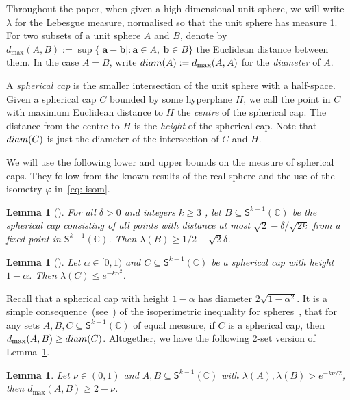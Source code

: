 \documentclass[11pt, a4paper]{article}
\newcommand{\V}[1]{\mathbold{#1}}
\newtheorem{lemma}[theorem]{Lemma}
\theoremstyle{definition}
\newcommand{\diam}[1]{{\rm{diam}}(#1)}
\newcommand{\sS}{\mathsf{S}}
\newcommand{\sC}{\mathbb{C}}
\begin{document}
Throughout the paper, when given a high dimensional unit sphere, we will write $\lambda$ for the Lebesgue measure, normalised so that the unit sphere has measure 1. For two subsets of a unit sphere $A$ and $B$, denote by $d_{\max}(A,B):=\sup\{|\V{a}-\V{b}|: \V{a}\in A,~\V{b}\in B \}$ the Euclidean distance between them. In the case $A=B$, write $\diam{A}:=d_{\max}(A,A)$ for the \emph{diameter} of $A$.  

A \emph{spherical cap} is the smaller intersection of the unit sphere with a half-space. Given a spherical cap $C$ bounded by some hyperplane $H$, we call the point in $C$ with maximum Euclidean distance to $H$ the \emph{centre} of the spherical cap. The distance from the centre to $H$ is the \emph{height} of the spherical cap. Note that $\diam{C}$ is just the diameter of the intersection of $C$ and $H$. 

We will use the following lower and upper bounds on the measure of spherical caps. They follow from the known results of the real sphere and the use of the isometry $\varphi$ in~\eqref{eq: isom}.



\begin{lemma}[\cite{BL-1}]\label{lem:cap-LB}
	For all $\delta>0$ and integers $k\ge 3$ , let $B\subseteq \sS^{k-1}(\sC)$ be the spherical cap consisting of all points with distance at most $\sqrt{2}-\delta/\sqrt{2k}$ from a fixed point in $\sS^{k-1}(\sC)$. Then $\lambda(B)\ge 1/2-\sqrt{2}\delta$.
\end{lemma}


\begin{lemma}[\cite{Tkocz}]\label{lem:cap-UB}
	Let $\alpha\in [0,1)$ and $C\subseteq \sS^{k-1}(\sC)$ be a spherical cap with height $1-\alpha$. Then $\lambda(C)\le e^{-k\alpha^2}$.
\end{lemma}

Recall that a spherical cap with height $1-\alpha$ has diameter $2\sqrt{1-\alpha^2}$.
It is a simple consequence~(see~\cite{BL-1}) of the isoperimetric inequality for spheres~\cite{Schmidt}, that for any sets $A,B,C\subseteq \sS^{k-1}(\sC)$ of equal measure, if $C$ is a spherical cap, then $d_{\max}(A,B)\ge \diam{C}$. Altogether, we have the following 2-set version of Lemma~\ref{lem:cap-UB}.

\begin{lemma}\label{lem:cap-2set}
	Let $\nu\in (0,1)$ and $A,B\subseteq\sS^{k-1}(\sC)$ with $\lambda(A), \lambda(B)>e^{-k\nu/2}$, then $d_{\max}(A,B)\ge 2-\nu$.
\end{lemma}
\end{document}
